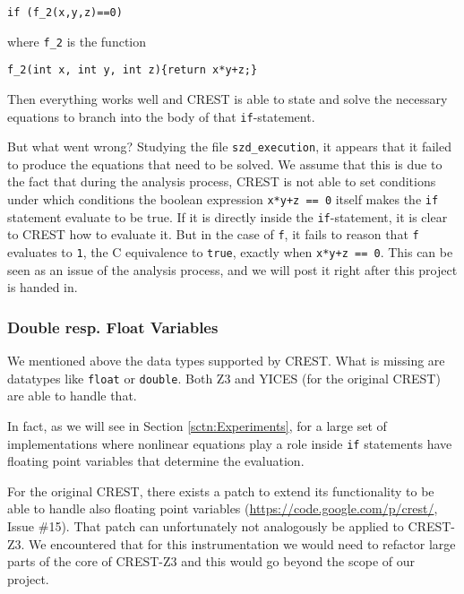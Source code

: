 \documentclass[oribibl]{llncs}
\begin{document}
\begin{verbatim}
if (f_2(x,y,z)==0)
\end{verbatim}

where \texttt{f\_2} is the function
\begin{verbatim}
f_2(int x, int y, int z){return x*y+z;}
\end{verbatim}

Then everything works well and \textsc{CREST} is able to state and
solve the necessary equations to branch into the body of that \texttt{if}-statement.

But what went wrong? Studying the file \texttt{szd\_execution}, it
appears that it failed to produce the equations that need to be
solved. We assume that this is due to the fact that during the
analysis process, \textsc{CREST} is not able to set conditions under
which conditions the boolean expression \texttt{x*y+z == 0} itself makes the
\texttt{if} statement evaluate to be true. If it is directly inside
the \texttt{if}-statement, it is clear to \textsc{CREST} how to
evaluate it. But in the case of \texttt{f}, it fails to reason that
\texttt{f} evaluates to
\texttt{1}, the \textsc{C} equivalence to \texttt{true}, exactly when \texttt{x*y+z == 0}.
This can be seen as an issue of the analysis process, and we will post
it right after this project is handed in.

\subsubsection{Double resp. Float Variables}

We mentioned above the data types supported by \textsc{CREST}. What is
missing are datatypes like \texttt{float} or \texttt{double}. Both
\textsc{Z3} and \textsc{YICES} (for the original \textsc{CREST}) are
able to handle that.

In fact, as we will see in Section \ref{sctn:Experiments}, for a large set
of implementations where nonlinear equations play a role inside \texttt{if}
statements have floating point variables that determine the
evaluation.

For the original \textsc{CREST}, there exists a patch to extend its
functionality to be able to handle also floating point variables
(\url{https://code.google.com/p/crest/}, Issue \#15). That
patch can unfortunately not analogously be applied to
\textsc{CREST-Z3}. We encountered that for this instrumentation we
would need to refactor large parts of the core of \textsc{CREST-Z3}
and this would go beyond the scope of our project.
\end{document}
